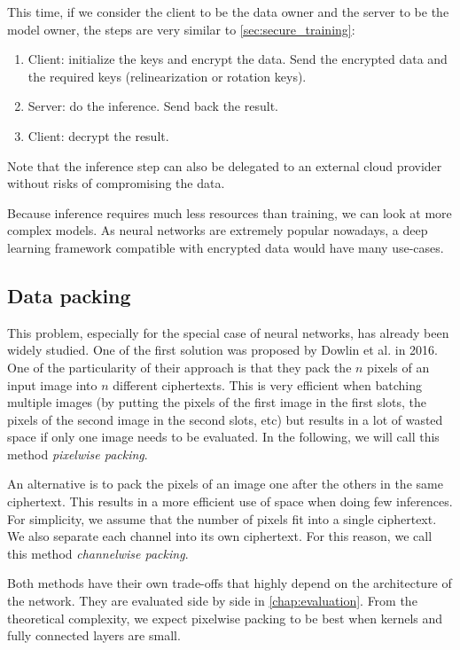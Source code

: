 \documentclass[a4paper,11pt,oneside]{report}
\begin{document}
This time, if we consider the client to be the data owner and the server to be the model owner, the steps are very similar to \autoref{sec:secure_training}:
\begin{enumerate}
    \item Client: initialize the keys and encrypt the data. Send the encrypted data and the required keys (relinearization or rotation keys).
    \item Server: do the inference. Send back the result.
    \item Client: decrypt the result.
\end{enumerate}

Note that the inference step can also be delegated to an external cloud provider without risks of compromising the data.

Because inference requires much less resources than training, we can look at more complex models. 
As neural networks are extremely popular nowadays, a deep learning framework compatible with encrypted data would have many use-cases.

\subsection{Data packing}

This problem, especially for the special case of neural networks, has already been widely studied. One of the first solution was proposed by Dowlin et al. \cite{dowlin_cryptonets_2016} in 2016. 
One of the particularity of their approach is that they pack the $n$ pixels of an input image into $n$ different ciphertexts. 
This is very efficient when batching multiple images (by putting the pixels of the first image in the first slots, the pixels of the second image in the second slots, etc) but results in a lot of wasted space if only one image needs to be evaluated. 
In the following, we will call this method \emph{pixelwise packing}.

An alternative is to pack the pixels of an image one after the others in the same ciphertext. 
This results in a more efficient use of space when doing few inferences. For simplicity, we assume that the number of pixels fit into a single ciphertext. 
We also separate each channel into its own ciphertext. 
For this reason, we call this method \emph{channelwise packing}.

Both methods have their own trade-offs that highly depend on the architecture of the network. 
They are evaluated side by side in \autoref{chap:evaluation}. 
From the theoretical complexity, we expect pixelwise packing to be best when kernels and fully connected layers are small.
\end{document}
